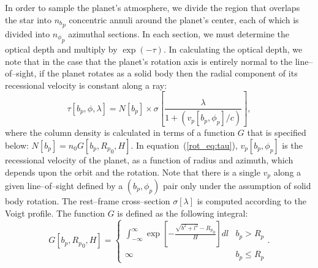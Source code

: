 In order to sample the planet's atmosphere, we divide the region that
overlaps the star into ${n_b}_p$ concentric annuli around the planet's
center, each of which is divided into ${n_\phi}_p$ azimuthal sections.
In each section, we must determine the optical depth and multiply by
$\exp{\left(-\tau\right)}$.  In calculating the optical depth, we note
that in the case that the planet's rotation axis is entirely normal to
the line--of--sight, if the planet rotates as a solid body then the
radial component of its recessional velocity is constant along a ray:
\begin{equation}
\tau[b_p, \phi, \lambda] = N[b_p] \times \sigma\left[\frac{\lambda}{1 + (v_p[b_p, \phi_p] /c)}\right],
\label{rot_eq:tau}
\end{equation}
where the column density is calculated in terms of a function $G$ that
is specified below: $N[b_p] = n_0 G[b_p, {R_p}_0, H]$.  In
equation~(\ref{rot_eq:tau}), $v_p[b_p, \phi_p]$ is the recessional
velocity of the planet, as a function of radius and azimuth, which
depends upon the orbit and the rotation.  Note that there is a single
$v_p$ along a given line--of--sight defined by a $(b_p,\phi_p)$ pair
only under the assumption of solid body rotation.  The rest--frame
cross--section $\sigma[\lambda]$ is computed according to the Voigt
profile.  The function $G$ is defined as the following integral:
\begin{equation}
G[b_p, {R_p}_0, H] = \left\{ \begin{array}{ll}
\int_{-\infty}^{\infty} \exp\left[-\frac{\sqrt{b^2 + l^2} - {R_p}_0}{H}\right] d l & b_p > R_p \\
\infty & b_p \leq R_p
\end{array} \right. .
\label{rot_eq:funcG}
\end{equation}

